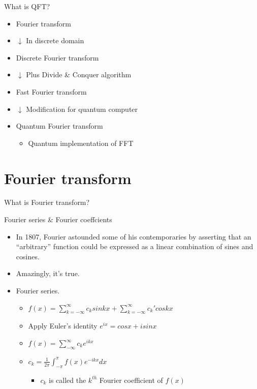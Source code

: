 \begin{frame}{What is QFT?}

\begin{itemize}
\itemsep1pt\parskip0pt
\item
  Fourier transform
\item
  $\downarrow$ In discrete domain
\item
  Discrete Fourier transform
\item
  $\downarrow$ Plus Divide \& Conquer algorithm
\item
  Fast Fourier transform
\item
  $\downarrow$ Modification for quantum computer
\item
  Quantum Fourier transform

  \begin{itemize}
  \itemsep1pt\parskip0pt
  \item
    Quantum implementation of FFT
  \end{itemize}
\end{itemize}

\end{frame}

\section{Fourier transform}\label{fourier-transform}

\begin{frame}{What is Fourier transform?}

\begin{block}{Fourier series \& Fourier coeffcients}

\begin{itemize}
\item
  In 1807, Fourier astounded some of his contemporaries by asserting
  that an ``arbitrary'' function could be expressed as a linear
  combination of sines and cosines.
\item
  Amazingly, it's true.
\item
  Fourier series.

  \begin{itemize}
  \item
    $f(x) = \sum_{k=-\infty}^{\infty} c_{k}sinkx+\sum_{k=-\infty}^{\infty} c_{k}' coskx$
  \item
    Apply Euler's identity $e^{ix}=cosx+isinx$
  \item
    $f(x)=\sum_{-\infty}^{\infty} c_{k}e^{ikx}$
  \item
    $c_{k} = \frac{1}{2\pi}\int_{-\pi}^{\pi} f(x)e^{-ikx} dx$

    \begin{itemize}
    \itemsep1pt\parskip0pt
    \item
      $c_{k}$ is called the $k^{th}$ Fourier coefficient of $f(x)$
    \end{itemize}
  \end{itemize}
\end{itemize}

\end{block}

\end{frame}

